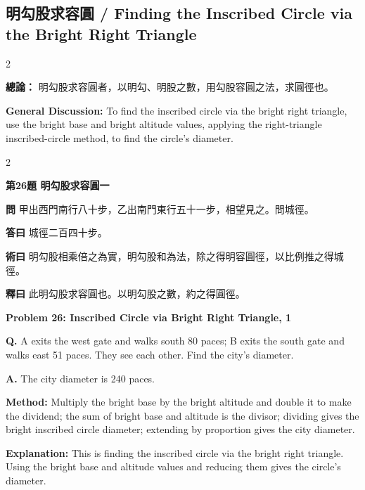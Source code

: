 \documentclass[11pt,a4paper]{article}
\newcommand{\wen}[1]{\noindent\textbf{問} #1\par\smallskip}
\newcommand{\da}[1]{\noindent\textbf{答曰} #1\par\smallskip}
\newcommand{\shu}[1]{\noindent\textbf{術曰} #1\par\smallskip}
\newcommand{\shi}[1]{\noindent\textbf{釋曰} #1\par\smallskip}
\newcommand{\wenE}[1]{\noindent\textbf{Q.} #1\par\smallskip}
\newcommand{\daE}[1]{\noindent\textbf{A.} #1\par\smallskip}
\newcommand{\shuE}[1]{\noindent\textbf{Method:} #1\par\smallskip}
\newcommand{\shiE}[1]{\noindent\textbf{Explanation:} #1\par\smallskip}
\begin{document}
\clearpage

\subsection*{明勾股求容圓 / Finding the Inscribed Circle via the Bright Right Triangle}

\begin{paracol}{2}

\noindent\textbf{總論：} 明勾股求容圓者，以明勾、明股之數，用勾股容圓之法，求圓徑也。

\switchcolumn

\noindent\textbf{General Discussion:} To find the inscribed circle via the bright right triangle, use the bright base and bright altitude values, applying the right-triangle inscribed-circle method, to find the circle's diameter.

\end{paracol}

\bigskip

\begin{paracol}{2}

\noindent\textbf{第26題 明勾股求容圓一}

\wen{甲出西門南行八十步，乙出南門東行五十一步，相望見之。問城徑。}
\da{城徑二百四十步。}
\shu{明勾股相乘倍之為實，明勾股和為法，除之得明容圓徑，以比例推之得城徑。}
\shi{此明勾股求容圓也。以明勾股之數，約之得圓徑。}

\switchcolumn

\noindent\textbf{Problem 26: Inscribed Circle via Bright Right Triangle, 1}

\wenE{A exits the west gate and walks south 80 paces; B exits the south gate and walks east 51 paces. They see each other. Find the city's diameter.}
\daE{The city diameter is 240 paces.}
\shuE{Multiply the bright base by the bright altitude and double it to make the dividend; the sum of bright base and altitude is the divisor; dividing gives the bright inscribed circle diameter; extending by proportion gives the city diameter.}
\shiE{This is finding the inscribed circle via the bright right triangle. Using the bright base and altitude values and reducing them gives the circle's diameter.}

\end{paracol}
\end{document}

